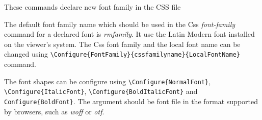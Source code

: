 
These commands declare new font family in the CSS file


The default font family name which should be used in the Css
\textit{font-family} command for a declared font is \textit{rmfamily}. 
It use the Latin Modern font installed on the viewer's system. 
The Css font family and the local font name can be changed using
\verb|\Configure{FontFamily}{cssfamilyname}{LocalFontName}| command.

\begin{texsource}
\end{texsource}

The font shapes can be configure using \verb|\Configure{NormalFont}|, 
\verb|\Configure{ItalicFont}|, \verb|\Configure{BoldItalicFont}| and
\verb|Configure{BoldFont}|. The argument should be font file in the format
supported by browsers, such as \textit{woff} or \textit{otf}.

\begin{texsource}
\end{texsource}
